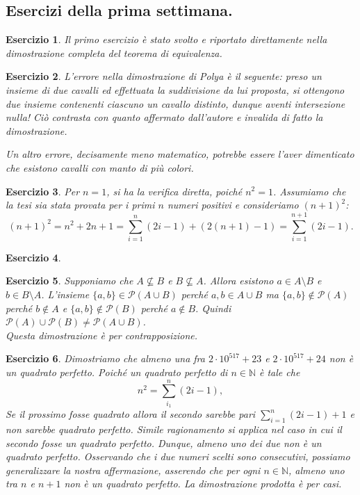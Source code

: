 \documentclass[fontsize = 11 pt, paper=A4, oneside, index=totoc, hyperref]{article}
\theoremstyle{definition}
\theoremstyle{plain}
\newtheorem{exe}{Esercizio}[section]
\newcommand{\N}{\mathbb{N}}
\begin{document}
\subsection{Esercizi della prima settimana.}
\begin{exe}
  Il primo esercizio è stato svolto e riportato direttamente nella dimostrazione completa del teorema di equivalenza.
\end{exe}
\begin{exe}
  L'errore nella dimostrazione di Polya è il seguente: preso un insieme di due cavalli ed effettuata la suddivisione da lui proposta, si ottengono due insieme contenenti ciascuno un cavallo distinto, dunque aventi intersezione nulla! Ciò contrasta con quanto affermato dall'autore e invalida di fatto la dimostrazione.

  Un altro errore, decisamente meno matematico, potrebbe essere l'aver dimenticato che esistono cavalli con manto di più colori.
\end{exe}
\begin{exe}
  Per \(n = 1\), si ha la verifica diretta, poiché \(n^2 = 1\). Assumiamo che la tesi sia stata provata per i primi \(n\) numeri positivi e consideriamo \((n+1)^2\):
  \begin{equation}
    (n+1)^2 = n^2 + 2n + 1 = \sum_{i=1}^n (2i - 1) + (2(n + 1) - 1) = \sum_{i = 1}^{n+1}(2i - 1).
  \end{equation}
\end{exe}
\begin{exe}
\end{exe}

\begin{exe}
Supponiamo che $A \not\subseteq B$ e $B \not\subseteq A$. Allora esistono $a \in A\setminus B$ e $b\in B\setminus A$. L'insieme $\{ a,b\} \in \mathcal{P} (A\cup B)$ perché $a,b\in A\cup B$ ma $\{ a,b\} \not\in \mathcal{P} (A)$ perché $b \not\in A$ e $\{ a,b\} \not\in \mathcal{P} (B)$ perché $a \not\in B$. Quindi $\mathcal{P} (A) \cup \mathcal{P} (B) \not = \mathcal{P} (A\cup B)$. \\
Questa dimostrazione è per contrapposizione.
\end{exe}

\begin{exe}
  Dimostriamo che almeno una fra \(2\cdot10^517 + 23\) e \(2\cdot10^517+24\) non è un quadrato perfetto. Poiché un quadrato perfetto di \(n \in \N\) è tale che
  \[
  n^2 = \sum_{i_1}^{n}(2i - 1),
  \]
  Se il prossimo fosse quadrato allora il secondo sarebbe pari \(\sum_{i=1}^n(2i-1) + 1\) e non sarebbe quadrato perfetto. Simile ragionamento si applica nel caso in cui il secondo fosse un quadrato perfetto. Dunque, almeno uno dei due non è un quadrato perfetto. Osservando che i due numeri scelti sono consecutivi, possiamo generalizzare la nostra affermazione, asserendo che per ogni \(n \in \N\), almeno uno tra \(n\) e \(n+1\) non è un quadrato perfetto. La dimostrazione prodotta è per casi.
\end{exe}
\end{document}
